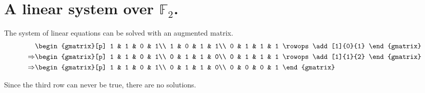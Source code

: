 \section{A linear system over $\mathbb{F}_2$.}
The system of linear equations can be solved with an augmented matrix.
\begin{align*}
    & \begin{gmatrix}[p]
        1 & 1 & 0 & 1\\
        1 & 0 & 1 & 1\\
        0 & 1 & 1 & 1
        \rowops
        \add[1]{0}{1}
      \end{gmatrix} \\
    \Rightarrow 
    & \begin{gmatrix}[p]
        1 & 1 & 0 & 1\\
        0 & 1 & 1 & 0\\
        0 & 1 & 1 & 1
        \rowops
        \add[1]{1}{2}
      \end{gmatrix} \\
    \Rightarrow 
    & \begin{gmatrix}[p]
        1 & 1 & 0 & 1\\
        0 & 1 & 1 & 0\\
        0 & 0 & 0 & 1
      \end{gmatrix} \\
  \end{align*}

Since the third row can never be true, there are no solutions.